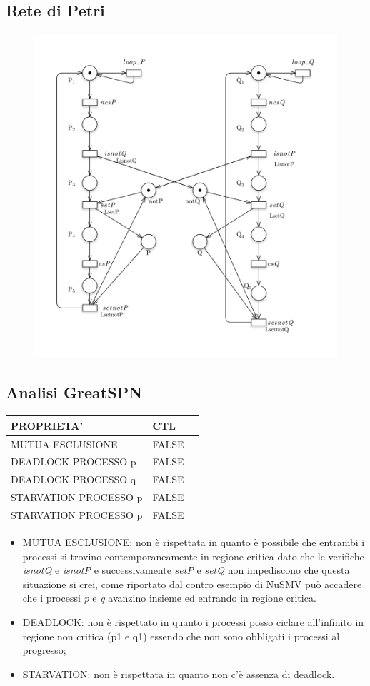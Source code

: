 \documentclass{article}
\begin{document}
\subsection{Rete di Petri}
\begin{figure}[h] 
\centering
\includegraphics[scale=0.4]{3.6-5.png}
\end{figure}
\subsection{Analisi GreatSPN}
\begin{tabular}{ |p{6cm}||p{3cm}|p{3cm}|}
 \hline
 PROPRIETA'& CTL\\
 \hline
 MUTUA ESCLUSIONE&FALSE \\
 DEADLOCK PROCESSO p&FALSE \\
 DEADLOCK PROCESSO q&FALSE\\
 STARVATION PROCESSO p&FALSE\\
 STARVATION PROCESSO p&FALSE\\
\hline
\end{tabular}
\begin{itemize}
    \item MUTUA ESCLUSIONE: non è rispettata in quanto è possibile che entrambi i processi si trovino contemporaneamente in regione critica dato che le verifiche \textit{isnotQ} e \textit{isnotP} e successivamente \textit{setP} e \textit{setQ} non impediscono che questa situazione si crei, come riportato dal contro esempio di NuSMV può accadere che i processi \textit{p} e \textit{q} avanzino insieme ed entrando in regione critica.
    \item DEADLOCK: non è rispettato in quanto i processi posso ciclare all'infinito in regione non critica (p1 e q1) essendo che non sono obbligati i processi al progresso;
    \item STARVATION: non è rispettata in quanto non c'è assenza di deadlock.
\end{itemize}
\clearpage
\end{document}
